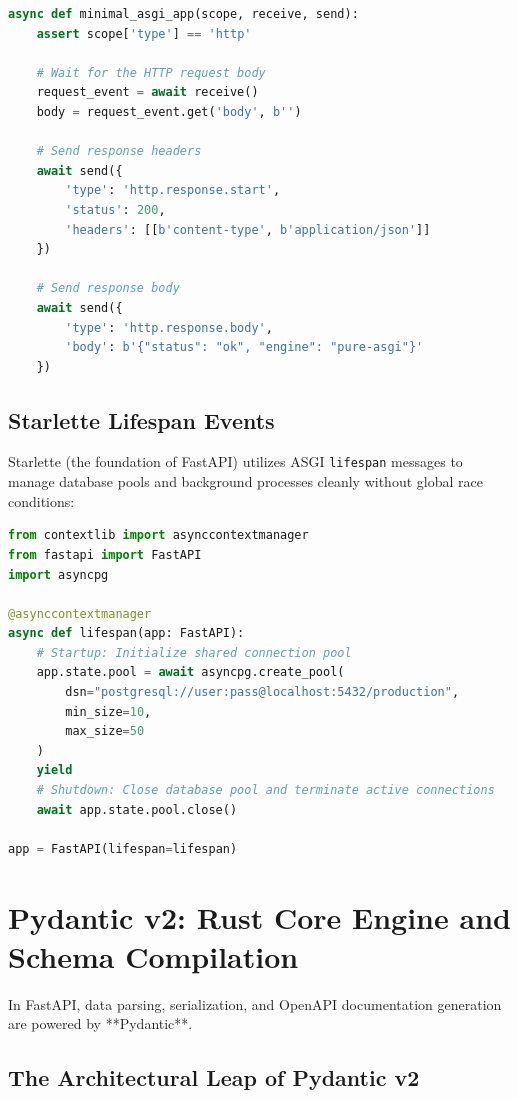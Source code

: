 \begin{lstlisting}[language=Python,caption={Raw ASGI HTTP Handler from Scratch}]
async def minimal_asgi_app(scope, receive, send):
    assert scope['type'] == 'http'
    
    # Wait for the HTTP request body
    request_event = await receive()
    body = request_event.get('body', b'')

    # Send response headers
    await send({
        'type': 'http.response.start',
        'status': 200,
        'headers': [[b'content-type', b'application/json']]
    })

    # Send response body
    await send({
        'type': 'http.response.body',
        'body': b'{"status": "ok", "engine": "pure-asgi"}'
    })
\end{lstlisting}

\subsection{Starlette Lifespan Events}

Starlette (the foundation of FastAPI) utilizes ASGI \texttt{lifespan} messages to manage database pools and background processes cleanly without global race conditions:

\begin{lstlisting}[language=Python,caption={Modern FastAPI Lifespan Handler}]
from contextlib import asynccontextmanager
from fastapi import FastAPI
import asyncpg

@asynccontextmanager
async def lifespan(app: FastAPI):
    # Startup: Initialize shared connection pool
    app.state.pool = await asyncpg.create_pool(
        dsn="postgresql://user:pass@localhost:5432/production",
        min_size=10,
        max_size=50
    )
    yield
    # Shutdown: Close database pool and terminate active connections
    await app.state.pool.close()

app = FastAPI(lifespan=lifespan)
\end{lstlisting}

\section{Pydantic v2: Rust Core Engine and Schema Compilation}

In FastAPI, data parsing, serialization, and OpenAPI documentation generation are powered by **Pydantic**. 

\subsection{The Architectural Leap of Pydantic v2}

